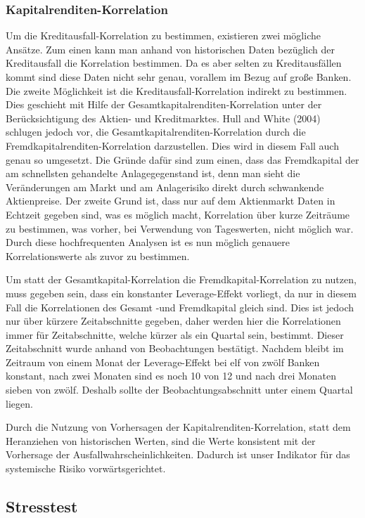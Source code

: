 \documentclass[a4paper,12pt]{scrartcl}
\begin{document}
\subsubsection{Kapitalrenditen-Korrelation}
Um die Kreditausfall-Korrelation zu bestimmen, existieren zwei mögliche Ansätze.
Zum einen kann man anhand von historischen Daten bezüglich der Kreditausfall die Korrelation bestimmen. Da es aber selten zu Kreditausfällen kommt sind diese Daten nicht sehr genau, vorallem im Bezug auf große Banken.
Die zweite Möglichkeit ist die Kreditausfall-Korrelation indirekt zu bestimmen. Dies geschieht mit Hilfe der Gesamtkapitalrenditen-Korrelation unter der Berücksichtigung des Aktien- und Kreditmarktes. Hull and White (2004) schlugen jedoch vor, die Gesamtkapitalrenditen-Korrelation durch die Fremdkapitalrenditen-Korrelation darzustellen. Dies wird in diesem Fall auch genau so umgesetzt. Die Gründe dafür sind zum einen, dass das Fremdkapital der am schnellsten gehandelte Anlagegegenstand ist, denn man sieht die Veränderungen am Markt und am Anlagerisiko direkt durch schwankende Aktienpreise. Der zweite Grund ist, dass nur auf dem Aktienmarkt Daten in Echtzeit gegeben sind, was es möglich macht, Korrelation über kurze Zeiträume zu bestimmen, was vorher, bei Verwendung von Tageswerten, nicht möglich war.
Durch diese hochfrequenten Analysen ist es nun möglich genauere Korrelationswerte als zuvor zu bestimmen.

Um statt der Gesamtkapital-Korrelation die Fremdkapital-Korrelation zu nutzen, muss gegeben sein, dass ein konstanter Leverage-Effekt vorliegt, da nur in diesem Fall die Korrelationen des Gesamt -und Fremdkapital gleich sind. Dies ist jedoch nur über kürzere Zeitabschnitte gegeben, daher werden hier die Korrelationen immer für Zeitabschnitte, welche kürzer als ein Quartal sein, bestimmt. Dieser Zeitabschnitt wurde anhand von Beobachtungen bestätigt. Nachdem bleibt im Zeitraum von einem Monat der Leverage-Effekt bei elf von zwölf Banken konstant, nach zwei Monaten sind es noch 10 von 12 und nach drei Monaten sieben von zwölf. Deshalb sollte der Beobachtungsabschnitt unter einem Quartal liegen.

Durch die Nutzung von Vorhersagen der Kapitalrenditen-Korrelation, statt dem Heranziehen von historischen Werten, sind die Werte konsistent mit der Vorhersage der Ausfallwahrscheinlichkeiten. Dadurch ist unser Indikator für das systemische Risiko vorwärtsgerichtet. 

\newpage
\subsection{Stresstest}
\end{document}
